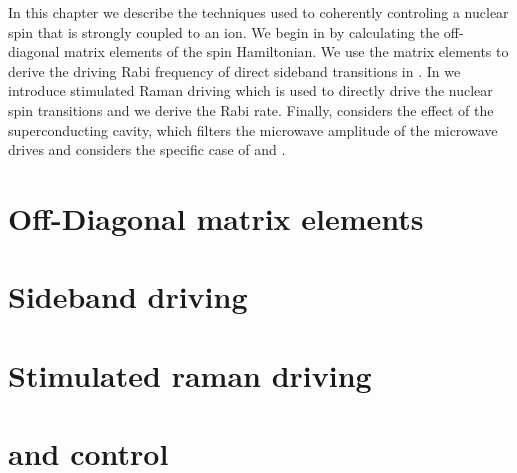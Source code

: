In this chapter we describe the techniques used to coherently controling a nuclear spin that is strongly coupled to an \Er ion. We begin in  by calculating the off-diagonal matrix elements of the spin Hamiltonian. We use the matrix elements to derive the driving Rabi frequency of direct sideband transitions in . In  we introduce stimulated Raman driving which is used to directly drive the nuclear spin transitions and we derive the Rabi rate. Finally,  considers the effect of the superconducting cavity, which filters the microwave amplitude of the microwave drives and considers the specific case of \W and \Nb. 

\section{Off-Diagonal matrix elements}

\section{Sideband driving}

\section{Stimulated raman driving}

\section[183W and 93Nb control]{\W and \Nb control}
